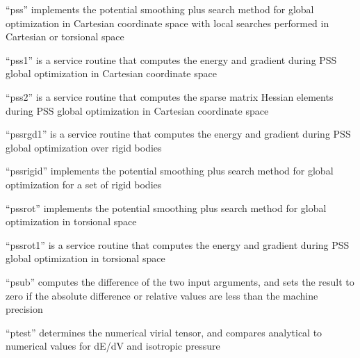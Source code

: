 \documentclass[letterpaper,11pt,english]{sphinxmanual}
\begin{document}
\sphinxAtStartPar
“pss” implements the potential smoothing plus search method for global optimization in Cartesian coordinate space with local searches performed in Cartesian or torsional space

\sphinxAtStartPar
{}

\sphinxAtStartPar
“pss1” is a service routine that computes the energy and gradient during PSS global optimization in Cartesian coordinate space

\sphinxAtStartPar
{}

\sphinxAtStartPar
“pss2” is a service routine that computes the sparse matrix Hessian elements during PSS global optimization in Cartesian coordinate space

\sphinxAtStartPar
{}

\sphinxAtStartPar
“pssrgd1” is a service routine that computes the energy and gradient during PSS global optimization over rigid bodies

\sphinxAtStartPar
{}

\sphinxAtStartPar
“pssrigid” implements the potential smoothing plus search method for global optimization for a set of rigid bodies

\sphinxAtStartPar
{}

\sphinxAtStartPar
“pssrot” implements the potential smoothing plus search method for global optimization in torsional space

\sphinxAtStartPar
{}

\sphinxAtStartPar
“pssrot1” is a service routine that computes the energy and gradient during PSS global optimization in torsional space

\sphinxAtStartPar
{}

\sphinxAtStartPar
{}

\sphinxAtStartPar
“psub” computes the difference of the two input arguments, and sets the result to zero if the absolute difference or relative values are less than the machine precision

\sphinxAtStartPar
{}

\sphinxAtStartPar
“ptest” determines the numerical virial tensor, and compares analytical to numerical values for dE/dV and isotropic pressure

\sphinxAtStartPar
{}
\end{document}
